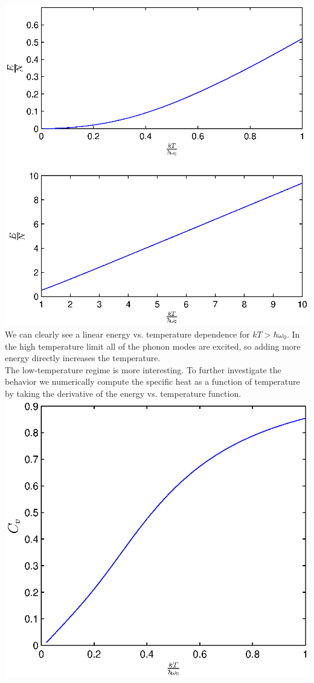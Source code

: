 \documentclass[a4paper,10pt]{article}
\numberwithin{equation}{section}
\begin{document}
\\
\includegraphics{p1_01}
We can clearly see a linear energy vs. temperature dependence for $kT>\hbar \omega_0$. 
In the high temperature limit all of the phonon modes are excited, so adding more energy directly increases the temperature. \\
The low-temperature regime is more interesting. 
To further investigate the behavior we numerically compute the specific heat as a function of temperature by taking the derivative of the energy vs. temperature function.
\\
\includegraphics{p1_02}
\\
\end{document}
